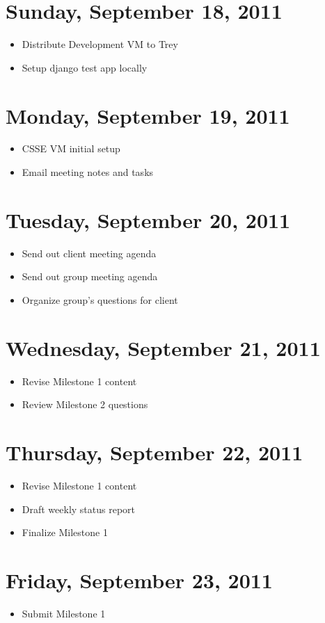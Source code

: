 \documentclass{article}
\begin{document}
\section{Sunday, September 18, 2011}
\begin{itemize}
\item Distribute Development VM to Trey
\item Setup django test app locally
\end{itemize}

\section{Monday, September 19, 2011}
\begin{itemize}
\item CSSE VM initial setup
\item Email meeting notes and tasks
\end{itemize}

\section{Tuesday, September 20, 2011}
\begin{itemize}
\item Send out client meeting agenda
\item Send out group meeting agenda
\item Organize group's questions for client
\end{itemize}

\section{Wednesday, September 21, 2011}
\begin{itemize}
\item Revise Milestone 1 content
\item Review Milestone 2 questions
\end{itemize}

\section{Thursday, September 22, 2011}
\begin{itemize}
\item Revise Milestone 1 content
\item Draft weekly status report
\item Finalize Milestone 1
\end{itemize}

\section{Friday, September 23, 2011}
\begin{itemize}
\item Submit Milestone 1
\end{itemize}
\end{document}
